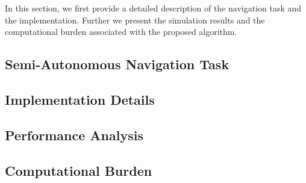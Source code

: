 In this section, we first provide a detailed description of the navigation task and the implementation. Further we present the simulation results and the computational burden associated with the proposed algorithm.
\subsection{Semi-Autonomous Navigation Task}

\subsection{Implementation Details}

\newpage
\subsection{Performance Analysis}

\newpage
\subsection{Computational Burden}

